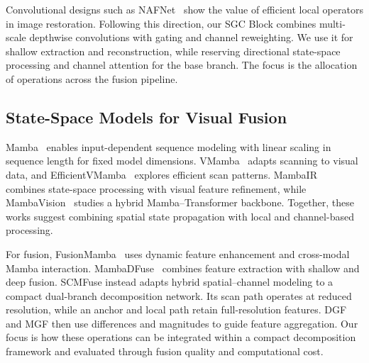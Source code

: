 Convolutional designs such as NAFNet~\cite{chen2022simple} show the value of efficient local operators in image restoration. Following this direction, our SGC Block combines multi-scale depthwise convolutions with gating and channel reweighting. We use it for shallow extraction and reconstruction, while reserving directional state-space processing and channel attention for the base branch. The focus is the allocation of operations across the fusion pipeline.

\subsection{State-Space Models for Visual Fusion}
Mamba~\cite{gu2023mamba} enables input-dependent sequence modeling with linear scaling in sequence length for fixed model dimensions. VMamba~\cite{liu2024vmamba} adapts scanning to visual data, and EfficientVMamba~\cite{pei2025efficientvmamba} explores efficient scan patterns. MambaIR~\cite{guo2024mambair} combines state-space processing with visual feature refinement, while MambaVision~\cite{hatamizadeh2025mambavision} studies a hybrid Mamba--Transformer backbone. Together, these works suggest combining spatial state propagation with local and channel-based processing.

For fusion, FusionMamba~\cite{xie2024fusionmamba} uses dynamic feature enhancement and cross-modal Mamba interaction. MambaDFuse~\cite{li2024mambadfuse} combines feature extraction with shallow and deep fusion. SCMFuse instead adapts hybrid spatial--channel modeling to a compact dual-branch decomposition network. Its scan path operates at reduced resolution, while an anchor and local path retain full-resolution features. DGF and MGF then use differences and magnitudes to guide feature aggregation. Our focus is how these operations can be integrated within a compact decomposition framework and evaluated through fusion quality and computational cost.
